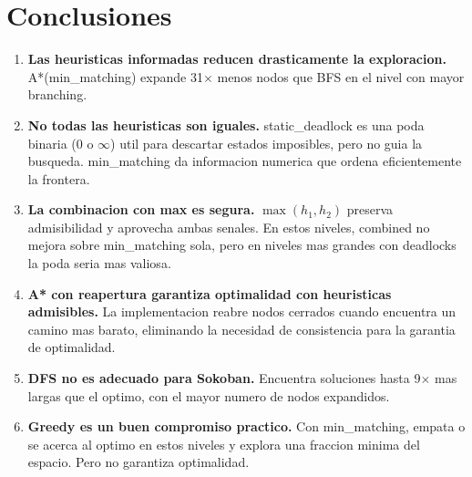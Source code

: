 \documentclass[12pt, a4paper]{article}
\begin{document}
\section{Conclusiones}

\begin{enumerate}
  \item \textbf{Las heuristicas informadas reducen drasticamente la exploracion.} A*(min\_matching) expande 31$\times$ menos nodos que BFS en el nivel con mayor branching.

  \item \textbf{No todas las heuristicas son iguales.} static\_deadlock es una poda binaria ($0$ o $\infty$) util para descartar estados imposibles, pero no guia la busqueda. min\_matching da informacion numerica que ordena eficientemente la frontera.

  \item \textbf{La combinacion con max es segura.} $\max(h_1, h_2)$ preserva admisibilidad y aprovecha ambas senales. En estos niveles, combined no mejora sobre min\_matching sola, pero en niveles mas grandes con deadlocks la poda seria mas valiosa.

  \item \textbf{A* con reapertura garantiza optimalidad con heuristicas admisibles.} La implementacion reabre nodos cerrados cuando encuentra un camino mas barato, eliminando la necesidad de consistencia para la garantia de optimalidad.

  \item \textbf{DFS no es adecuado para Sokoban.} Encuentra soluciones hasta 9$\times$ mas largas que el optimo, con el mayor numero de nodos expandidos.

  \item \textbf{Greedy es un buen compromiso practico.} Con min\_matching, empata o se acerca al optimo en estos niveles y explora una fraccion minima del espacio. Pero no garantiza optimalidad.
\end{enumerate}
\end{document}
